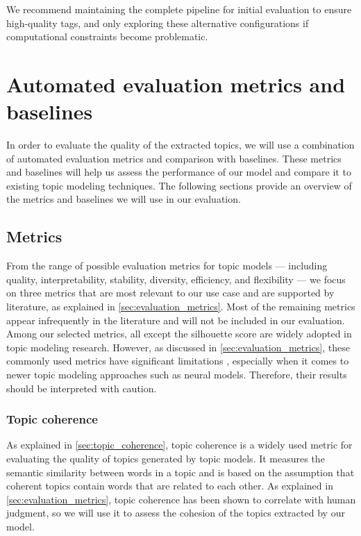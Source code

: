 We recommend maintaining the complete pipeline for initial evaluation to ensure high-quality tags, and only exploring these alternative configurations if computational constraints become problematic.

\section{Automated evaluation metrics and baselines}
\label{sec:automated_evaluation_methodology}
In order to evaluate the quality of the extracted topics, we will use a combination of automated evaluation metrics and comparison with baselines. These metrics and baselines will help us assess the performance of our model and compare it to existing topic modeling techniques. The following sections provide an overview of the metrics and baselines we will use in our evaluation.

\subsection{Metrics}
From the range of possible evaluation metrics for topic models — including quality, interpretability, stability, diversity, efficiency, and flexibility — we focus on three metrics that are most relevant to our use case and are supported by literature, as explained in \cref{sec:evaluation_metrics}. Most of the remaining metrics appear infrequently in the literature and will not be included in our evaluation. Among our selected metrics, all except the silhouette score are widely adopted in topic modeling research. However, as discussed in \cref{sec:evaluation_metrics}, these commonly used metrics have significant limitations \cite{doogan_topic_2021, hoyle_is_2021}, especially when it comes to newer topic modeling approaches such as neural models. Therefore, their results should be interpreted with caution.

\subsubsection{Topic coherence}
As explained in \cref{sec:topic_coherence}, topic coherence is a widely used metric for evaluating the quality of topics generated by topic models. It measures the semantic similarity between words in a topic and is based on the assumption that coherent topics contain words that are related to each other. As explained in \cref{sec:evaluation_metrics}, topic coherence has been shown to correlate with human judgment, so we will use it to assess the cohesion of the topics extracted by our model.

